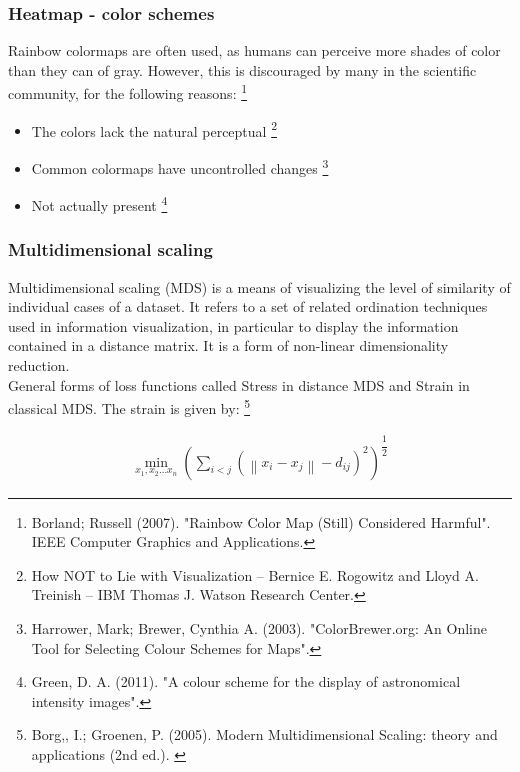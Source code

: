 \documentclass{beamer}
\begin{document}
\begin{frame}
  \frametitle{Heatmap - color schemes}
  \qquad Rainbow colormaps are often used, as humans can perceive more shades of color than they can of gray. However, this is discouraged by many in the scientific community, for the following reasons:  
  \footnote{\tiny{Borland;  Russell (2007). "Rainbow Color Map (Still) Considered Harmful". IEEE Computer Graphics and Applications.}}

  \begin{itemize}
    \item The colors lack the natural perceptual
      \footnote{\tiny{How NOT to Lie with Visualization – Bernice E. Rogowitz and Lloyd A. Treinish – IBM Thomas J. Watson Research Center.}}

    \item Common colormaps have uncontrolled changes
      \footnote{\tiny{Harrower, Mark; Brewer, Cynthia A. (2003). "ColorBrewer.org: An Online Tool for Selecting Colour Schemes for Maps".}}

    \item Not actually present
      \footnote{\tiny{Green, D. A. (2011). "A colour scheme for the display of astronomical intensity images".}}

  \end{itemize}

\end{frame}

\begin{frame}
  \frametitle{Multidimensional scaling}
  \qquad Multidimensional scaling (MDS) is a means of visualizing the level of similarity of individual cases of a dataset. It refers to a set of related ordination techniques used in information visualization, in particular to display the information contained in a distance matrix. It is a form of non-linear dimensionality reduction.\\
  \qquad General forms of loss functions called Stress in distance MDS and Strain in classical MDS. The strain is given by:
  \footnote{\tiny{Borg,, I.; Groenen, P. (2005). Modern Multidimensional Scaling: theory and applications (2nd ed.). }}

  \begin{eqnarray}
    \min _{x_{1},x_{2}\ldots x_{n}}\left( \sum _{i < j}\left( \left\| x_{i}-x_{j}\right\| -d_{ij}\right) ^{2}\right) ^{\dfrac {1}{2}}
  \end{eqnarray}


\end{frame}
\end{document}
